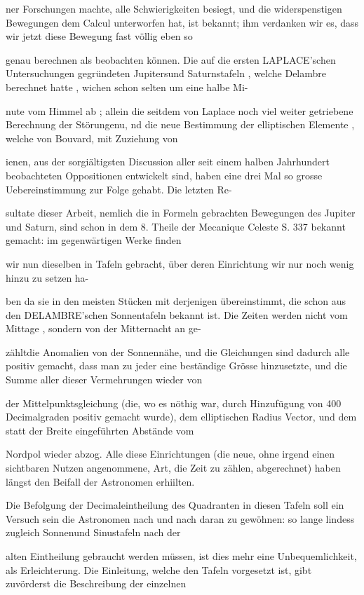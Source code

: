 \documentclass[10pt,a4paper]{article}
\begin{document}
ner Forschungen machte, alle Schwierigkeiten besiegt, und die widerspenstigen Bewegungen dem Calcul unterworfen hat, ist bekannt; ihm verdanken wir es, dass wir jetzt diese Bewegung fast völlig eben so

genau berechnen als beobachten können. Die auf die ersten LAPLACE'schen Untersuchungen gegründeten Jupitersund Saturnstafeln , welche Delambre berechnet hatte , wichen schon selten um eine halbe Mi-

nute vom Himmel ab ; allein die seitdem von Laplace noch viel weiter getriebene Berechnung der Störungenu, nd die neue Bestimmung der elliptischen Elemente , welche von Bouvard, mit Zuziehung von

ienen, aus der sorgiältigsten Discussion aller seit einem halben Jahrhundert beobachteten Oppositionen entwickelt sind, haben eine drei Mal so grosse Uebereinstimmung zur Folge gehabt. Die letzten Re-

sultate dieser Arbeit, nemlich die in Formeln gebrachten Bewegungen des Jupiter und Saturn, sind schon in dem 8. Theile der Mecanique Celeste S. 337 bekannt gemacht: im gegenwärtigen Werke finden

wir nun dieselben in Tafeln gebracht, über deren Einrichtung wir nur noch wenig hinzu zu setzen ha-

ben da sie in den meisten Stücken mit derjenigen übereinstimmt, die schon aus den DELAMBRE'schen Sonnentafeln bekannt ist. Die Zeiten werden nicht vom Mittage , sondern von der Mitternacht an ge-

zähltdie Anomalien von der Sonnennähe, und die Gleichungen sind dadurch alle positiv gemacht, dass man zu jeder eine beständige Grösse hinzusetzte, und die Summe aller dieser Vermehrungen wieder von

der Mittelpunktsgleichung (die, wo es nöthig war, durch Hinzufügung von 400 Decimalgraden positiv gemacht wurde), dem elliptischen Radius Vector, und dem statt der Breite eingeführten Abstände vom

Nordpol wieder abzog. Alle diese Einrichtungen (die neue, ohne irgend einen sichtbaren Nutzen angenommene, Art, die Zeit zu zählen, abgerechnet) haben längst den Beifall der Astronomen erhiilten.

Die Befolgung der Decimaleintheilung des Quadranten in diesen Tafeln soll ein Versuch sein die Astronomen nach und nach daran zu gewöhnen: so lange lindess zugleich Sonnenund Sinustafeln nach der

alten Eintheilung gebraucht werden müssen, ist dies mehr eine Unbequemlichkeit, als Erleichterung. Die Einleitung, welche den Tafeln vorgesetzt ist, gibt zuvörderst die Beschreibung der einzelnen
\end{document}
